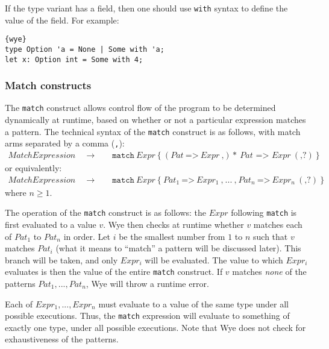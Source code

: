 \documentclass[a4paper, 12pt]{article}
\newcommand{\substo}{\quad\rightarrow\quad}
\begin{document}
If the type variant has a field, then one should use \texttt{with} syntax to define the value of the field. For example:
\begin{lstlisting}{wye}
type Option 'a = None | Some with 'a;
let x: Option int = Some with 4;
\end{lstlisting}

\subsubsection{Match constructs}
The \texttt{match} construct allows control flow of the program to be determined dynamically at runtime, based on whether or not a particular expression matches a pattern. The technical syntax of the \texttt{match} construct is as follows, with match arms separated by a comma (\texttt{,}):
\begin{align*}
MatchExpression \substo& \texttt{match}\: Expr \: \texttt{\{} \: (Pat \: \texttt{=>}\: Expr\: \texttt{,})*\: Pat\texttt{ => } Expr \: (\texttt{,}?) \: \texttt{\}}
\end{align*}
or equivalently:
\begin{align*}
MatchExpression \substo& \texttt{match}\: Expr \: \texttt{\{} \: Pat_1 \: \texttt{=>}\: Expr_1\: \texttt{,} \:  ... \: \texttt{,}\:Pat_n \: \texttt{=>}\: Expr_n\: (\texttt{,}?) \: \texttt{\}}
\end{align*}
where $n \geq 1$. 

The operation of the \texttt{match} construct is as follows: the $Expr$ following \texttt{match} is first evaluated to a value $v$. Wye then checks at runtime whether $v$ matches each of $Pat_1$ to $Pat_n$ in order. Let $i$ be the smallest number from $1$ to $n$ such that $v$ matches $Pat_i$ (what it means to ``match'' a pattern will be discussed later). This branch will be taken, and only $Expr_i$ will be evaluated. The value to which $Expr_i$ evaluates is then the value of the entire \texttt{match} construct. If $v$ matches \textit{none} of the patterns $Pat_1, ..., Pat_n$, Wye will throw a runtime error. 

Each of $Expr_1, ..., Expr_n$ must evaluate to a value of the same type under all possible executions. Thus, the \texttt{match} expression will evaluate to something of exactly one type, under all possible executions. Note that Wye does not check for exhaustiveness of the patterns.
\end{document}

